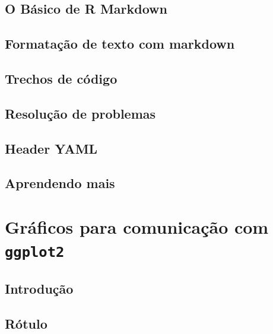 \documentclass[
]{latex/krantz}
\theoremstyle{definition}
\theoremstyle{definition}
\theoremstyle{definition}
\theoremstyle{definition}
\theoremstyle{remark}
\begin{document}
\hypertarget{o-buxe1sico-de-r-markdown}{%
\section{O Básico de R Markdown}\label{o-buxe1sico-de-r-markdown}}

\hypertarget{formatauxe7uxe3o-de-texto-com-markdown}{%
\section{Formatação de texto com markdown}\label{formatauxe7uxe3o-de-texto-com-markdown}}

\hypertarget{trechos-de-cuxf3digo}{%
\section{Trechos de código}\label{trechos-de-cuxf3digo}}

\hypertarget{resoluuxe7uxe3o-de-problemas}{%
\section{Resolução de problemas}\label{resoluuxe7uxe3o-de-problemas}}

\hypertarget{header-yaml}{%
\section{Header YAML}\label{header-yaml}}

\hypertarget{aprendendo-mais-1}{%
\section{Aprendendo mais}\label{aprendendo-mais-1}}

\hypertarget{gruxe1ficos-para-comunicauxe7uxe3o-com-ggplot2}{%
\chapter{\texorpdfstring{Gráficos para comunicação com \texttt{ggplot2}}{Gráficos para comunicação com ggplot2}}\label{gruxe1ficos-para-comunicauxe7uxe3o-com-ggplot2}}

\hypertarget{introduuxe7uxe3o-18}{%
\section{Introdução}\label{introduuxe7uxe3o-18}}

\hypertarget{ruxf3tulo}{%
\section{Rótulo}\label{ruxf3tulo}}
\end{document}
